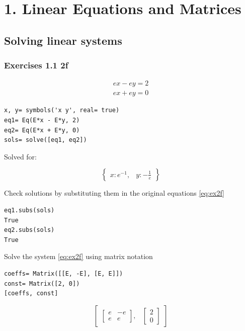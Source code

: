 \section{1. Linear Equations and Matrices}

\subsection{Solving linear systems}

\subsubsection{Exercises 1.1 2f} 

\begin{equation}\label{eq:ex2f}
    \begin{matrix}
    e x - e y = 2 \\
    e x + e y = 0
    \end{matrix}
\end{equation}

\begin{verbatim}
x, y= symbols('x y', real= true)
eq1= Eq(E*x - E*y, 2)
eq2= Eq(E*x + E*y, 0)
sols= solve([eq1, eq2])
\end{verbatim}

Solved for:

\begin{equation}\label{eq:ex2fsol}
\begin{Bmatrix}x : e^{-1}, & y : - \frac{1}{e}\end{Bmatrix}
\end{equation}

Check solutions by substituting them in the original equations \ref{eq:ex2f}

\begin{verbatim}
eq1.subs(sols)
True
eq2.subs(sols)
True
\end{verbatim}

Solve the system \ref{eq:ex2f} using matrix notation

\begin{verbatim}
coeffs= Matrix([[E, -E], [E, E]])
const= Matrix([2, 0])
[coeffs, const]
\end{verbatim}

\begin{equation}\label{eq:na}
\begin{bmatrix}\left[\begin{matrix}e & - e\\e & e\end{matrix}\right], & \left[\begin{matrix}2\\0\end{matrix}\right]\end{bmatrix}
\end{equation}

